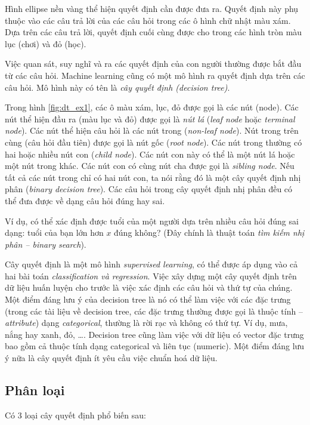 \documentclass[../main-report.tex]{subfiles}
\begin{document}
Hình ellipse nền vàng thể hiện quyết định cần được đưa ra. Quyết định này phụ thuộc vào các câu trả lời của các câu hỏi trong các ô hình chữ nhật màu xám. Dựa trên các câu trả lời, quyết định cuối cùng được cho trong các hình tròn màu lục (chơi) và đỏ (học).

Việc quan sát, suy nghĩ và ra các quyết định của con người thường được bắt đầu từ các câu hỏi. Machine learning cũng có một mô hình ra quyết định dựa trên các câu hỏi. Mô hình này có tên là \textit{cây quyết định (decision tree)}.

Trong hình \ref{fig:dt_ex1}, các ô màu xám, lục, đỏ được gọi là các nút (node). Các nút thể hiện đầu ra (màu lục và đỏ) được gọi là \textit{nút lá} (\textit{leaf node} hoặc \textit{terminal node}). Các nút thể hiện câu hỏi là các nút trong (\textit{non-leaf node}). Nút trong trên cùng (câu hỏi đầu tiên) được gọi là nút gốc (\textit{root node}). Các nút trong thường có hai hoặc nhiều nút con (\textit{child node}). Các nút con này có thể là một nút lá hoặc một nút trong khác. Các nút con có cùng nút cha được gọi là \textit{sibling node}. Nếu tất cả các nút trong chỉ có hai nút con, ta nói rằng đó là một cây quyết định nhị phân (\emph{binary decision tree}). Các câu hỏi trong cây quyết định nhị phân đều có thể đưa được về dạng câu hỏi đúng hay sai.

Ví dụ, có thể xác định được tuổi của một người dựa trên nhiều câu hỏi đúng sai dạng: tuổi của bạn lớn hơn $x$ đúng không? (Đây chính là thuật toán \textit{tìm kiếm nhị phân – binary search}).

Cây quyết định là một mô hình \textit{supervised learning}, có thể được áp dụng vào cả hai bài toán \textit{classification và regression}. Việc xây dựng một cây quyết định trên dữ liệu huấn luyện cho trước là việc xác định các câu hỏi và thứ tự của chúng. Một điểm đáng lưu ý của decision tree là nó có thể làm việc với các đặc trưng (trong các tài liệu về decision tree, các đặc trưng thường được gọi là thuộc tính – \textit{attribute}) dạng \textit{categorical}, thường là rời rạc và không có thứ tự. Ví dụ, mưa, nắng hay xanh, đỏ, \ldots. Decision tree cũng làm việc với dữ liệu có vector đặc trưng bao gồm cả thuộc tính dạng categorical và liên tục (numeric). Một điểm đáng lưu ý nữa là cây quyết định ít yêu cầu việc chuẩn hoá dữ liệu.

\subsection{Phân loại}
Có 3 loại cây quyết định phổ biến sau:
\end{document}
